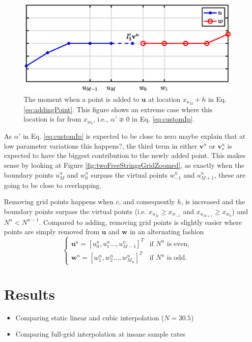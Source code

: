 \documentclass[dvipsnames, reprint]{JASA}
\def\SWcomment[#1]{\textcolor{Bittersweet}{#1}}
\begin{document}
\begin{figure}[h]
\includegraphics[width=\reprintcolumnwidth]{addingGridPoint}
\caption{\label{fig:addingPoint}{The moment when a point is added to $\mathbf{u}$ at location $x_{u_M} + h$ in Eq. \eqref{eq:addingPoint}. This figure shows an extreme case where this location is far from $x_{w_0}$, i.e., $\alpha' \not\approx 0$ in Eq. \eqref{eq:customIp}.}}
\end{figure} 

As $\alpha'$ in Eq. \eqref{eq:customIp} is expected to be close to zero \SWcomment[maybe explain that at low parameter variations this happens?], the third term in either $\mathbf{v}^n$ or $\mathbf{v}_\star^n$ is expected to have the biggest contribution to the newly added point. This makes sense by looking at Figure \ref{fig:twoFreeStringsGridZoomed}, as exactly when the boundary points $u_M^n$ and $w_0^n$ surpass the virtual points $w_{-1}^n$ and $u_{M+1}^n$, these are going to be close to overlapping.

Removing grid points happens when $c$, and consequently $h$, is increased and the boundary points surpass the virtual points (i.e. $x_{u_M} \geq x_{w_{-1}}$ and $x_{u_{M+1}} \geq x_{w_0}$) and $N^n < N^{n-1}$. Compared to adding, removing grid points is slightly easier where points are simply removed from $\mathbf{u}$ and $\mathbf{w}$ in an alternating fashion
\begin{equation}\label{eq:addingPoint}
\begin{cases}
    \mathbf{u}^n = [u_0^n, u_1^n ..., u_{M-1}^n]^T & \text{if $N^n$ is even}, \\
     \mathbf{w}^n = [w_1^n, w_2^n ..., w_{M_w}^n]^T & \text{if $N^n$ is odd}.
    \end{cases}
\end{equation}


\section{Results}\label{sec:results}
\begin{itemize}
    \item Comparing static linear and cubic interpolation ($N = 30.5$)
    \item Comparing full-grid interpolation at insane sample rates
\end{itemize}
\end{document}
